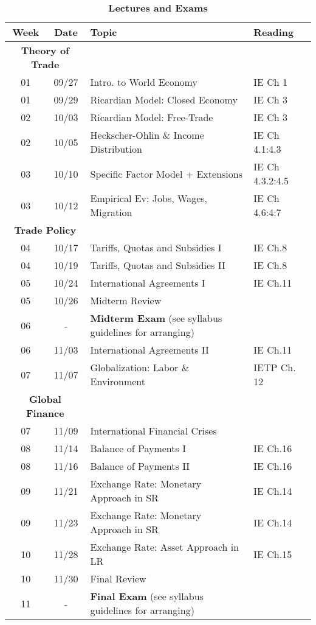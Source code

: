 \documentclass[10pt]{article}
\newcommand{\ra}[1]{\renewcommand{\arraystretch}{#1}}
\begin{document}
\begin{table}[h!]
	\caption*{\large\textbf{Lectures and Exams}}
	\centering
	\ra{1.5}
	\begin{tabular}{@{\extracolsep{0.5cm}} c c l l @{}}
		\toprule
		\textbf{Week} & \textbf{Date} & \textbf{Topic} & \textbf{Reading}  \\ \toprule
		 \multicolumn{2}{c}{\textbf{Theory of Trade}} & & \\
		01 & 09/27 & Intro. to World Economy & IE Ch 1 \\
		01 & 09/29 & Ricardian Model: Closed Economy & IE Ch 3 \\
		02 & 10/03 & Ricardian Model: Free-Trade & IE Ch 3 \\
		02 & 10/05 & Heckscher-Ohlin \& Income Distribution & IE Ch 4.1:4.3 \\
		03 & 10/10 & Specific Factor Model + Extensions & IE Ch 4.3.2:4.5  \\
		03 & 10/12 & Empirical Ev: Jobs, Wages, Migration  & IE Ch 4.6:4:7  \\ 
		\multicolumn{2}{c}{\textbf{Trade Policy}} & & \\
		04 & 10/17 & Tariffs, Quotas and Subsidies I & IE Ch.8\\ 
		04 & 10/19 & Tariffs, Quotas and Subsidies II & IE Ch.8  \\
		05 & 10/24 & International Agreements I & IE Ch.11 \\
		05 & 10/26 & Midterm Review & \\ \midrule 
		06 & - & \textbf{Midterm Exam} (see syllabus guidelines for arranging) & \\ \midrule
		06 & 11/03 & International Agreements II & IE Ch.11  \\
		07 & 11/07 & Globalization: Labor \& Environment  &  IETP Ch. 12 \\
		\multicolumn{2}{c}{\textbf{Global Finance}} & & \\
		07 & 11/09 & International Financial Crises &    \\ 
		08 & 11/14 & Balance of Payments I & IE Ch.16  \\ 
		08 & 11/16 & Balance of Payments II & IE Ch.16 \\
		09 & 11/21 & Exchange Rate: Monetary Approach in SR & IE Ch.14  \\
		09 & 11/23 & Exchange Rate: Monetary Approach in SR & IE Ch.14   \\
		10 & 11/28 & Exchange Rate: Asset Approach in LR & IE Ch.15 \\ 
		10 & 11/30 & Final Review &   \\  \midrule
		11 & - & \textbf{Final Exam} (see syllabus guidelines for arranging) & \\
		\bottomrule
	\end{tabular}
\end{table}
\end{document}
